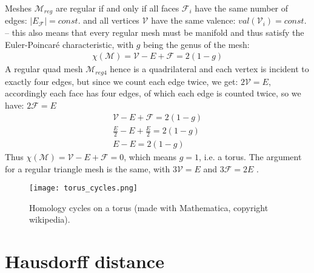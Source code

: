 Meshes $\mathcal{M}_{reg}$ are regular if and only if all faces $\mathcal{F}_{i}$ have the same number of edges: $|E_{\mathcal{F}}|=const.$ and all vertices $\mathcal{V}$ have the same valence: $val(\mathcal{V}_{i})=const.$ -- this also means that every regular mesh must be manifold and thus satisfy the Euler-Poincaré characteristic, with $g$ being the genus of the mesh:
\begin{eqnarray}
\chi(\mathcal{M})=\mathcal{V}-E+\mathcal{F}=2(1-g)
\end{eqnarray}
A regular quad mesh $\mathcal{M}_{reg4}$ hence is a quadrilateral and each vertex is incident to exactly four edges, but since we count each edge twice, we get: $2\mathcal{V}=E$, accordingly each face has four edges, of which each edge is counted twice, so we have: $2\mathcal{F}=E$
\begin{eqnarray}
\mathcal{V}-E+\mathcal{F}=2(1-g)\\
\frac{E}{2}-E+\frac{E}{2}=2(1-g)\\
E-E=2(1-g)
\end{eqnarray}
Thus $\chi(\mathcal{M})=\mathcal{V}-E+\mathcal{F}=0$, which means $g=1$, i.e. a torus.
The argument for a regular triangle mesh is the same, with $3\mathcal{V}=E$ and $3\mathcal{F}=2E$ \citep[cf.][]{Shene2005}.
\begin{figure}[ht]
\centering
\texttt{[image: torus\_cycles.png]}
\caption{Homology cycles on a torus (made with Mathematica, copyright wikipedia).}
\label{fig:torus_cycles}
\end{figure}

\newpage
\vspace*{1ex}
\section{Hausdorff distance}
\label{appendix5}


